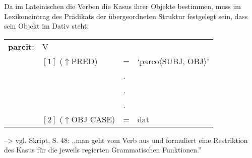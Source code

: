 \documentclass[12pt,a4paper]{article}
\begin{document}
Da im Lateinischen die Verben die Kasus ihrer Objekte bestimmen, muss im Lexikoneintrag des Prädikats der übergeordneten Struktur festgelegt sein, dass sein Objekt im Dativ steht: \\
\begin{singlespace}
\begin{tabular}{ l  l  l  l  } 
\textbf{parcit}: & V \\
$\qquad$ & $[1]$ \:  ($\uparrow$PRED) & = & `parco$\langle$SUBJ, OBJ$\rangle$' \\
$\qquad$ & $\qquad$ & . \\
$\qquad$ & $\qquad$ & . \\
$\qquad$ & $\qquad$ & . \\
$\qquad$ & $[2]$ \:  ($\uparrow$OBJ CASE) & = & dat \\
\end{tabular}
\newline
\newline
\end{singlespace}
--> vgl. Skript, S. 48: ,,man geht vom Verb aus und formuliert eine Restriktion
des Kasus für die jeweils regierten Grammatischen Funktionen.''


\end{document}
